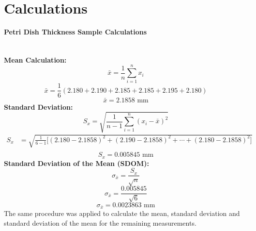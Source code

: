 \documentclass[12pt]{article}
\begin{document}
\newpage
\section{Calculations}
\paragraph{Petri Dish Thickness Sample Calculations} \mbox{}\\
\textbf{Mean Calculation:}
\[\bar{x} = \frac{1}{n} \sum_{i=1}^{n} x_i\]
\[\bar{x} = \frac{1}{6} (2.180+2.190+2.185+2.185+2.195+2.180)\]
\[\bar{x} =  \text{2.1858 mm}\]
\textbf{Standard Deviation:}
\[S_x = \sqrt{\frac{1}{n-1} \sum_{i=1}^{n} (x_i - \bar{x})^2}\]
\[
\begin{aligned}
S_x &= \sqrt{\frac{1}{6-1} \Big[ (2.180-2.1858)^2 + (2.190-2.1858)^2 + \cdots + (2.180-2.1858)^2 \Big]} \\
\end{aligned}
\]
\[S_x =  \text{0.005845 mm}\]
\textbf{Standard Deviation of the Mean (SDOM):}
\[\sigma_{\bar{x}} = \frac{S_x}{\sqrt{n}}\]
\[\sigma_{\bar{x}} = \frac{0.005845}{\sqrt{6}}\]
\[\sigma_{\bar{x}}=  \text{0.0023863 mm}\]
The same procedure was applied to calculate the mean, standard deviation and standard deviation of the mean for the remaining measurements.
\end{document}
